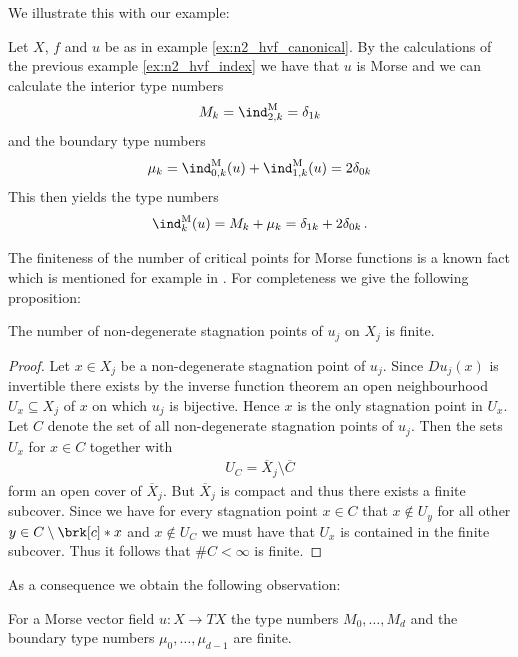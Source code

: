 We illustrate this with our example:
\begin{example}
  Let $X$, $f$ and $u$ be as in example \ref{ex:n2_hvf_canonical}. By the calculations of the previous example
  \ref{ex:n2_hvf_index} we have that $u$ is Morse and we can calculate the interior type numbers
  \begin{align*}
    M_k=\ind^\text{M}_{2,k}=\delta_{1k}
  \end{align*}
  and the boundary type numbers
  \begin{align*}
    \mu_k=\ind^\text{M}_{0,k}(u)+\ind^\text{M}_{1,k}(u)=2\delta_{0k}\\
  \end{align*}
  This then yields the type numbers
  \begin{align*}
    \ind^\text{M}_k(u)=M_k+\mu_k=\delta_{1k}+2\delta_{0k}\,.
  \end{align*}
\end{example}

The finiteness of the number of critical points for Morse functions is a known fact which is mentioned
for example in \cite{Morse1970}. For completeness we give the following proposition:
\begin{proposition}\label{pr:finiteness_critical_points}
  The number of non-degenerate
  stagnation points of $u_j$ on $X_j$ is finite.
\end{proposition}
\begin{proof}
  Let $x\in X_j$ be a non-degenerate stagnation point of $u_j$. Since $Du_j(x)$ is invertible there exists
  by the inverse function theorem an open neighbourhood $U_x\subseteq X_j$ of $x$ on which 
  $u_j$ is bijective. Hence $x$ is the only stagnation point in $U_x$. Let $C$ denote the set of all
  non-degenerate stagnation points of $u_j$. Then the sets $U_x$ for $x\in C$ together with
  \begin{align}
    U_C=\overline{X}_j\setminus \overline{C}
  \end{align}
  form an open cover of $\overline{X}_j$. But $\overline{X}_j$ is compact and thus there exists
  a finite subcover. Since we have for every stagnation point $x\in C$ that
  $x\not\in U_y$ for all other $y\in C\setminus\brk[c]*{x}$ and $x\not\in U_C$ we must have that $U_x$
  is contained in the finite subcover. Thus it follows that $\#C<\infty$ is finite.
\end{proof}
As a consequence we obtain the following observation:
\begin{corollary}\label{co:finiteness_type_nbrs}
  For a Morse vector field $u\colon X\to TX$ the type numbers $M_0,\dots,M_d$ and the boundary type numbers $\mu_0,\dots,\mu_{d-1}$
  are finite.
\end{corollary}

